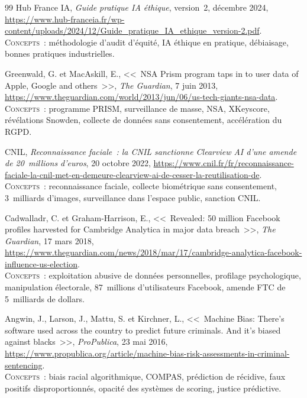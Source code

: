 \documentclass[12pt,a4paper]{article}
\begin{document}
\begin{thebibliography}{99}
Hub France IA, \textit{Guide pratique IA éthique}, version~2, décembre 2024,
\url{https://www.hub-franceia.fr/wp-content/uploads/2024/12/Guide_pratique_IA_ethique_version-2.pdf}.
\\[2pt] {\small \textsc{Concepts~:} méthodologie d'audit d'équité, IA éthique en pratique, débiaisage, bonnes pratiques industrielles.}


Greenwald, G. et MacAskill, E., <<~NSA Prism program taps in to user data of Apple, Google and others~>>, \textit{The Guardian}, 7 juin 2013,
\url{https://www.theguardian.com/world/2013/jun/06/us-tech-giants-nsa-data}.
\\[2pt] {\small \textsc{Concepts~:} programme PRISM, surveillance de masse, NSA, XKeyscore, révélations Snowden, collecte de données sans consentement, accélération du RGPD.}

CNIL, \textit{Reconnaissance faciale~: la CNIL sanctionne Clearview AI d'une amende de 20~millions d'euros}, 20 octobre 2022,
\url{https://www.cnil.fr/fr/reconnaissance-faciale-la-cnil-met-en-demeure-clearview-ai-de-cesser-la-reutilisation-de}.
\\[2pt] {\small \textsc{Concepts~:} reconnaissance faciale, collecte biométrique sans consentement, 3~milliards d'images, surveillance dans l'espace public, sanction CNIL.}


Cadwalladr, C. et Graham-Harrison, E., <<~Revealed: 50 million Facebook profiles harvested for Cambridge Analytica in major data breach~>>, \textit{The Guardian}, 17 mars 2018,
\url{https://www.theguardian.com/news/2018/mar/17/cambridge-analytica-facebook-influence-us-election}.
\\[2pt] {\small \textsc{Concepts~:} exploitation abusive de données personnelles, profilage psychologique, manipulation électorale, 87~millions d'utilisateurs Facebook, amende FTC de 5~milliards de dollars.}


Angwin, J., Larson, J., Mattu, S. et Kirchner, L., <<~Machine Bias: There's software used across the country to predict future criminals. And it's biased against blacks~>>, \textit{ProPublica}, 23 mai 2016,
\url{https://www.propublica.org/article/machine-bias-risk-assessments-in-criminal-sentencing}.
\\[2pt] {\small \textsc{Concepts~:} biais racial algorithmique, COMPAS, prédiction de récidive, faux positifs disproportionnés, opacité des systèmes de scoring, justice prédictive.}


\end{thebibliography}
\end{document}
